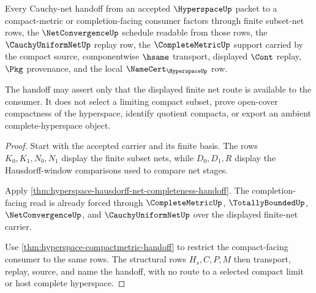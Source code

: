 \begin{theorem}
\label{thm:hyperspace-cauchy-net-compact-handoff}
Every Cauchy-net handoff from an accepted $\HyperspaceUp$ packet to a compact-metric or completion-facing consumer factors through finite subset-net rows, the $\NetConvergenceUp$ schedule readable from those rows, the $\CauchyUniformNetUp$ replay row, the $\CompleteMetricUp$ support carried by the compact source, componentwise $\hsame$ transport, displayed $\Cont$ replay, $\Pkg$ provenance, and the local $\NameCert_{\HyperspaceUp}$ row.

The handoff may assert only that the displayed finite net route is available to the consumer. It does not select a limiting compact subset, prove open-cover compactness of the hyperspace, identify quotient compacta, or export an ambient complete-hyperspace object.
\end{theorem}
\begin{proof}
Start with the accepted carrier and its finite basis. The rows $K_0,K_1,N_0,N_1$ display the finite subset nets, while $D_0,D_1,R$ display the Hausdorff-window comparisons used to compare net stages.

Apply \autoref{thm:hyperspace-hausdorff-net-completeness-handoff}. The completion-facing read is already forced through $\CompleteMetricUp$, $\TotallyBoundedUp$, $\NetConvergenceUp$, and $\CauchyUniformNetUp$ over the displayed finite-net carrier.

Use \autoref{thm:hyperspace-compactmetric-handoff} to restrict the compact-facing consumer to the same rows. The structural rows $H_s,C,P,M$ then transport, replay, source, and name the handoff, with no route to a selected compact limit or host complete hyperspace.
\end{proof}

